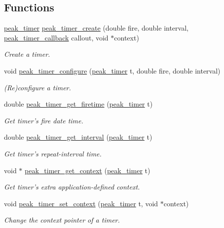 \subsection*{Functions}
\begin{CompactItemize}
\item 
\hyperlink{group__timer_ga0}{peak\_\-timer} \hyperlink{group__timer_ga2}{peak\_\-timer\_\-create} (double fire, double interval, \hyperlink{group__timer_ga1}{peak\_\-timer\_\-callback} callout, void $\ast$context)
\begin{CompactList}\small\item\em Create a timer. \item\end{CompactList}\item 
void \hyperlink{group__timer_ga3}{peak\_\-timer\_\-configure} (\hyperlink{group__timer_ga0}{peak\_\-timer} t, double fire, double interval)
\begin{CompactList}\small\item\em (Re)configure a timer. \item\end{CompactList}\item 
double \hyperlink{group__timer_ga4}{peak\_\-timer\_\-get\_\-firetime} (\hyperlink{group__timer_ga0}{peak\_\-timer} t)
\begin{CompactList}\small\item\em Get timer's fire date time. \item\end{CompactList}\item 
double \hyperlink{group__timer_ga5}{peak\_\-timer\_\-get\_\-interval} (\hyperlink{group__timer_ga0}{peak\_\-timer} t)
\begin{CompactList}\small\item\em Get timer's repeat-interval time. \item\end{CompactList}\item 
void $\ast$ \hyperlink{group__timer_ga6}{peak\_\-timer\_\-get\_\-context} (\hyperlink{group__timer_ga0}{peak\_\-timer} t)
\begin{CompactList}\small\item\em Get timer's extra application-defined context. \item\end{CompactList}\item 
void \hyperlink{group__timer_ga7}{peak\_\-timer\_\-set\_\-context} (\hyperlink{group__timer_ga0}{peak\_\-timer} t, void $\ast$context)
\begin{CompactList}\small\item\em Change the context pointer of a timer. \item\end{CompactList}\end{CompactItemize}


